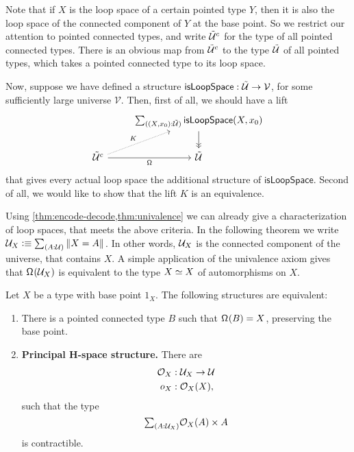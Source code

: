 \documentclass[reqno]{amsart}
\begin{document}
Note that if $X$ is the loop space of a certain pointed type $Y$, 
then it is also the loop space of the connected component of $Y$ at the base point.
So we restrict our attention to pointed connected types, and write
$\tilde{\mathcal{U}}^c$ for the type of all pointed connected types. 
There is an obvious map from $\tilde{\mathcal{U}}^c$ to the type $\tilde{\mathcal{U}}$ of all pointed types, which takes a pointed connected type to its loop space. 

Now, suppose we have defined a structure $\mathsf{isLoopSpace}:\tilde{\mathcal{U}}\to\mathcal{V}$, for some sufficiently large universe $\mathcal{V}$. Then, first of all, we should have a lift
\begin{equation*}
\begin{tikzcd}
& \sm{(X,x_0):\tilde{\UU}}\mathsf{isLoopSpace}(X,x_0) \arrow[d,->>] \\
\tilde{\UU}^c \arrow[r,swap,"\loopspacesym"] \arrow[ur,densely dotted,"K"] & \tilde{\UU}
\end{tikzcd}
\end{equation*}
that gives every actual loop space the additional structure of $\mathsf{isLoopSpace}$. Second of all, we would like to show that the lift $K$ is an equivalence. 

Using \autoref{thm:encode-decode,thm:univalence} we can already give a characterization
of loop spaces, that meets the above criteria. In the following theorem we write $\UU_X\defeq\sm{A:\UU}\brck{X=A}$.
In other words, $\mathcal{U}_X$ is the connected component of the universe, that contains $X$.
A simple application of the univalence axiom gives that $\mathsf{\Omega}^{}(\mathcal{U}_X)$ is
equivalent to the type $\eqv{X}{X}$ of automorphisms on $X$. 
\begin{comment}
Also, since $\UU_X$
is the image of a small type into a locally small type (more precisely, a point in the universe),
it follows that $\UU_X$ is equivalent to a type in $\UU$, provided that $\UU$
is closed under pushouts.
\end{comment}

\begin{thm}\label{thm:principal-hspaces}
Let $X$ be a type with base point $1_X$. The following structures are equivalent:
\begin{enumerate}
\item There is a pointed connected type $B$ such that $\mathsf{\Omega}^{}(B)=X$, preserving the base point.
\item \textbf{Principal H-space structure.} There are
\begin{align*}
\mathcal{O}_X & : \mathcal{U}_X\to\mathcal{U} \\
o_X & : \mathcal{O}_X(X),
\end{align*}
such that the type
\begin{equation*}
\sm{A:\UU_X}\mathcal{O}_X(A)\times A
\end{equation*}
is contractible. 
\end{enumerate}
\end{thm}
\end{document}
